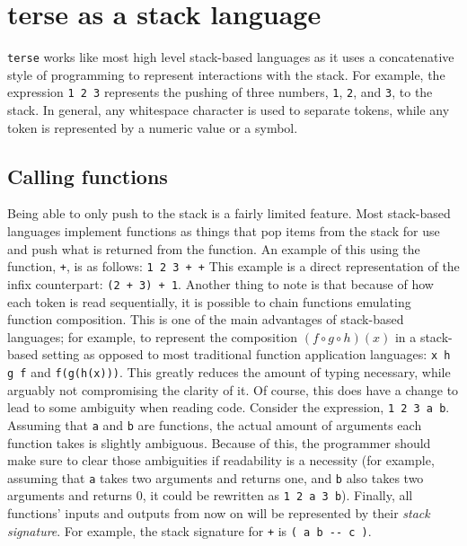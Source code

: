 \documentclass[12pt]{report}
\begin{document}
  \section{terse as a stack language}
  \verb|terse| works like most high level stack-based languages as it uses a
  concatenative style of programming to represent interactions with the stack.
  For example, the expression \verb|1 2 3| represents the pushing of three numbers,
  \verb|1|, \verb|2|, and \verb|3|, to the stack.  In general, any whitespace character
  is used to separate tokens, while any token is represented by a numeric value or
  a symbol.
  \subsection{Calling functions}
  Being able to only push to the stack is a fairly limited feature.  Most stack-based
  languages implement functions as things that pop items from the stack for use and
  push what is returned from the function.  An example of this using the function,
  \verb|+|, is as follows:
  \newline\newline
  \verb|1 2 3 + +|
  \newline\newline
  This example is a direct representation of the infix counterpart: \verb|(2 + 3) + 1|.
  Another thing to note is that because of how each token is read sequentially, it
  is possible to chain functions emulating function composition.  This is one of
  the main advantages of stack-based languages; for example, to represent the
  composition \begin{math}(f\circ g\circ h)(x)\end{math} in a stack-based
  setting as opposed to most traditional function application languages:
  \verb|x h g f| and \verb|f(g(h(x)))|.  This greatly reduces the amount of typing
  necessary, while arguably not compromising the clarity of it.  Of course, this does
  have a change to lead to some ambiguity when reading code.  Consider the expression,
  \verb|1 2 3 a b|.  Assuming that \verb|a| and \verb|b| are functions, the actual
  amount of arguments each function takes is slightly ambiguous.  Because of this,
  the programmer should make sure to clear those ambiguities if readability is a
  necessity (for example, assuming that \verb|a| takes two arguments and returns one,
  and \verb|b| also takes two arguments and returns 0, it could be rewritten as
  \verb|1 2 a 3 b|).
  \newline\newline
  Finally, all functions' inputs and outputs from now on will be represented by
  their \emph{stack signature}.  For example, the stack signature for \verb|+| is
  \verb|( a b -- c )|.
\end{document}

